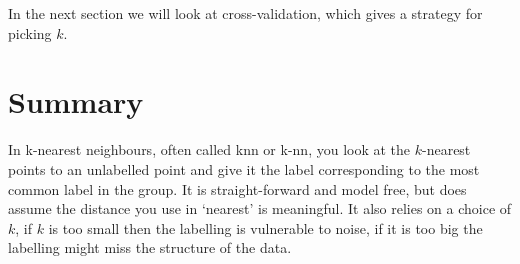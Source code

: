 \documentclass[12pt]{article}
\begin{document}
In the next section we will look at cross-validation, which gives a
strategy for picking $k$. 

\section*{Summary}
In k-nearest neighbours, often called knn or k-nn, you look at the
$k$-nearest points to an unlabelled point and give it the label
corresponding to the most common label in the group. It is
straight-forward and model free, but does assume the distance you use
in `nearest' is meaningful. It also relies on a choice of $k$, if $k$
is too small then the labelling is vulnerable to noise, if it is too
big the labelling might miss the structure of the data.
\end{document}

